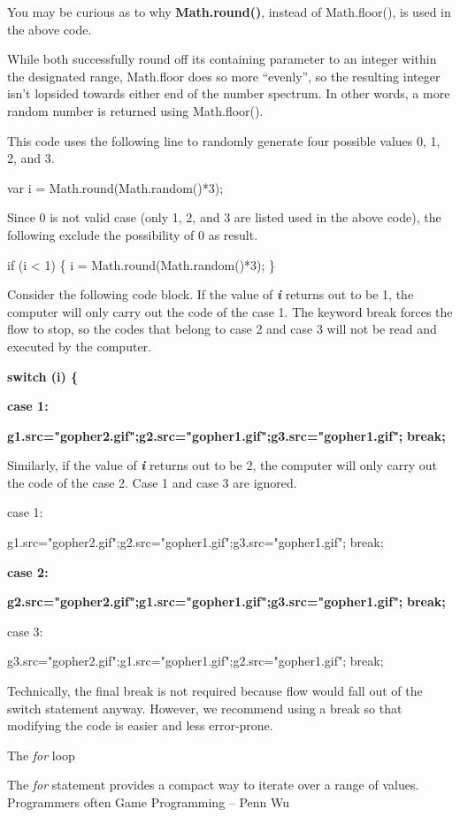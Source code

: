 \documentclass[
]{article}
\begin{document}
You may be curious as to why \textbf{Math.round()}, instead of
Math.floor(), is used in the above code.

While both successfully round off its containing parameter to an integer
within the designated range, Math.floor does so more ``evenly'', so the
resulting integer isn't lopsided towards either end of the number
spectrum. In other words, a more random number is returned using
Math.floor().

This code uses the following line to randomly generate four possible
values 0, 1, 2, and 3.

var i = Math.round(Math.random()*3);

Since 0 is not valid case (only 1, 2, and 3 are listed used in the above
code), the following exclude the possibility of 0 as result.

if (i \textless{} 1) \{ i = Math.round(Math.random()*3); \}

Consider the following code block. If the value of \emph{\textbf{i}}
returns out to be 1, the computer will only carry out the code of the
case 1. The keyword break forces the flow to stop, so the codes that
belong to case 2 and case 3 will not be read and executed by the
computer.

\textbf{switch (i) \{}

\textbf{case 1:}

\textbf{g1.src="gopher2.gif";g2.src="gopher1.gif";g3.src="gopher1.gif";}
\textbf{break;}

Similarly, if the value of \emph{\textbf{i}} returns out to be 2, the
computer will only carry out the code of the case 2. Case 1 and case 3
are ignored.

case 1:

g1.src="gopher2.gif";g2.src="gopher1.gif";g3.src="gopher1.gif"; break;

\textbf{case 2:}

\textbf{g2.src="gopher2.gif";g1.src="gopher1.gif";g3.src="gopher1.gif";}
\textbf{break;}

case 3:

g3.src="gopher2.gif";g1.src="gopher1.gif";g2.src="gopher1.gif"; break;

Technically, the final break is not required because flow would fall out
of the switch statement anyway. However, we recommend using a break so
that modifying the code is easier and less error-prone.

The \emph{for} loop

The \emph{for} statement provides a compact way to iterate over a range
of values. Programmers often Game Programming -- Penn Wu
\end{document}
